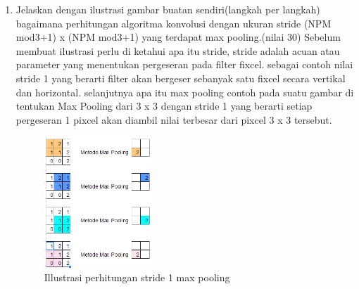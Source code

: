 \begin{enumerate}
	\item Jelaskan dengan ilustrasi gambar buatan sendiri(langkah per langkah) bagaimana perhitungan algoritma konvolusi dengan ukuran stride (NPM mod3+1) x (NPM mod3+1) yang terdapat max pooling.(nilai 30)
	\hfill \break
	Sebelum membuat ilustrasi perlu di ketahui apa itu stride, stride adalah acuan atau parameter yang menentukan pergeseran pada ﬁlter ﬁxcel. sebagai contoh nilai stride 1 yang berarti ﬁlter akan bergeser sebanyak satu ﬁxcel secara vertikal dan horizontal. selanjutnya apa itu max pooling contoh pada suatu gambar di tentukan Max Pooling dari 3 x 3 dengan stride 1 yang berarti setiap pergeseran 1 pixcel akan diambil nilai terbesar dari pixcel 3 x 3 tersebut.
	\begin{figure}[H]
		\includegraphics[width=4cm]{figures/1174087/7/5.png}
		\centering
		\caption{Illustrasi perhitungan stride 1 max pooling}
	\end{figure}
\end{enumerate}

